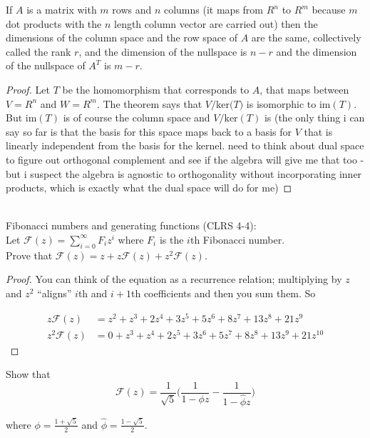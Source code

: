 \documentclass[12pt]{article}
\begin{document}
If $A$ is a matrix with $m$ rows and $n$ columns (it maps from $R^n$ to $R^m$ because $m$ dot products with the $n$ length column vector are carried out) then the dimensions of the column space and the row space of $A$ are the same, collectively called the rank $r$, and the dimension of the nullspace is $n-r$ and the dimension of the nullspace of $A^T$ is $m-r$.

\begin{proof}
Let $T$ be the homomorphism that corresponds to $A$, that maps between $V=R^n$ and $W=R^m$. The theorem says that $V/\text{ker($T$)}$
is isomorphic to $\text{im}(T)$. But im$(T)$ is of course the column space and $V/\text{ker}(T)$ is (the only thing i can say so far is that the basis for this space maps back to a basis for $V$ that is linearly independent from the basis for the kernel. need to think about dual space to figure out orthogonal complement and see if the algebra will give me that too - but i suspect the algebra is agnostic to orthogonality without incorporating inner products, which is exactly what the dual space will do for me)
\end{proof}

\date{5/29/2014}\\

Fibonacci numbers and generating functions (CLRS 4-4): \\

Let $\mathcal{F}(z) = \sum_{i=0}^\infty F_i z^i$ where $F_i$ is the $i$th Fibonacci number. \\

Prove that $\mathcal{F}(z) = z + z \mathcal{F}(z) + z^2 \mathcal{F}(z)$.

\begin{proof}
You can think of the equation as a recurrence relation; multiplying by $z$ and $z^2$ ``aligns'' $i$th and $i+1$th coefficients and then you sum them.
So 

\begin{align*} 
z \mathcal{F}(z) &= z^2 + z^3 + 2z^4 + 3z^5 + 5z^6 +8z^7 + 13z^8 + 21z^9 \\
z^2 \mathcal{F}(z) &=0 + z^3 + z^4 + 2z^5 + 3z^6 + 5z^7 +8z^8 + 13z^9 + 21z^{10}
\end{align*}

\end{proof}

Show that 
$$
\mathcal{F}(z) = \frac{1}{\sqrt{5}}\bigg(\frac{1}{1-\phi z}-\frac{1}{1-\hat{\phi}z}\bigg)
$$

where $\phi = \frac{1+\sqrt{5}}{2}$ and $\hat{\phi} = \frac{1-\sqrt{5}}{2}$.
\end{document}
